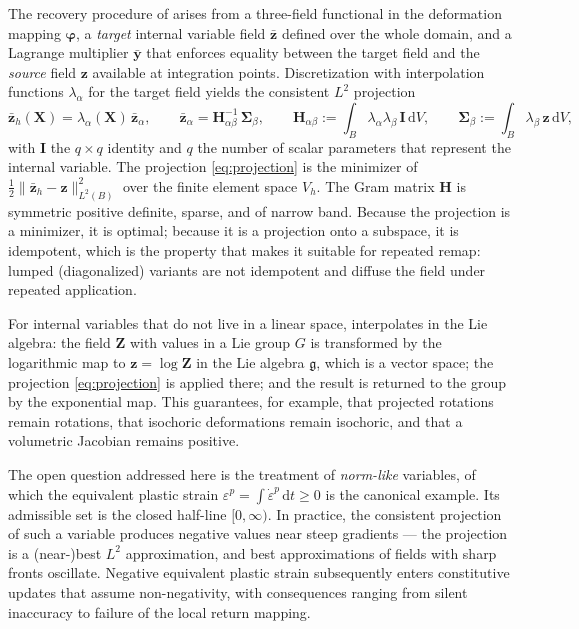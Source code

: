 \documentclass[11pt]{article}
\newcommand{\dd}{\mathrm{d}}
\newcommand{\norm}[1]{\lVert #1 \rVert}
\newcommand{\bs}[1]{\boldsymbol{#1}}
\begin{document}
The recovery procedure of \cite{mota2013} arises from a three-field
functional in the deformation mapping $\bs{\varphi}$, a
\emph{target} internal variable field $\bar{\bs{z}}$ defined over the whole
domain, and a Lagrange multiplier $\bar{\bs{y}}$ that enforces equality
between the target field and the \emph{source} field $\bs{z}$ available at
integration points. Discretization with interpolation functions
$\lambda_\alpha$ for the target field yields the consistent $L^2$
projection
\begin{equation}
\bar{\bs{z}}_h(\bs{X}) = \lambda_\alpha(\bs{X})\,\bar{\bs{z}}_\alpha,
\qquad
\bar{\bs{z}}_\alpha = \bs{H}_{\alpha\beta}^{-1}\,\bs{\Sigma}_\beta,
\qquad
\bs{H}_{\alpha\beta} := \int_B \lambda_\alpha \lambda_\beta\, \bs{I} \, \dd V,
\qquad
\bs{\Sigma}_\beta := \int_B \lambda_\beta\, \bs{z} \, \dd V,
\label{eq:projection}
\end{equation}
with $\bs{I}$ the $q \times q$ identity and $q$ the number of scalar
parameters that represent the internal variable. The projection
\eqref{eq:projection} is the minimizer of
$\tfrac12 \norm{\bar{\bs{z}}_h - \bs{z}}_{L^2(B)}^2$ over the finite
element space $V_h$. The Gram matrix $\bs{H}$ is symmetric positive
definite, sparse, and of narrow band. Because the projection is a
minimizer, it is optimal; because it is a projection onto a subspace, it is
idempotent, which is the property that makes it suitable for repeated
remap: lumped (diagonalized) variants are not idempotent and diffuse the
field under repeated application.

For internal variables that do not live in a linear space, \cite{mota2013}
interpolates in the Lie algebra: the field $\bs{Z}$ with values in
a Lie group $G$ is transformed by the logarithmic map to $\bs{z} = \log
\bs{Z}$ in the Lie algebra $\mathfrak{g}$, which is a vector space;
the projection \eqref{eq:projection} is applied there; and the result is
returned to the group by the exponential map. This guarantees, for
example, that projected rotations remain rotations, that isochoric
deformations remain isochoric, and that a volumetric Jacobian remains
positive.

The open question addressed here is the treatment of \emph{norm-like}
variables, of which the equivalent plastic strain
$\varepsilon^p = \int \dot{\varepsilon}^p \,\dd t \geq 0$
is the canonical example. Its admissible set is the closed half-line
$[0,\infty)$. In practice, the consistent projection of such a variable
produces negative values near steep gradients --- the projection is a
(near-)best $L^2$ approximation, and best approximations of fields with
sharp fronts oscillate. Negative equivalent plastic strain subsequently
enters constitutive updates that assume non-negativity, with consequences
ranging from silent inaccuracy to failure of the local return mapping.
\end{document}
